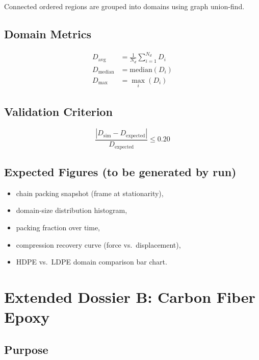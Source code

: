\documentclass[12pt]{article}
\begin{document}
Connected ordered regions are grouped into domains using graph union-find.

\subsection{Domain Metrics}

\begin{align}
	D_{\mathrm{avg}}    &= \frac{1}{N_d}\sum_{i=1}^{N_d} D_i
	\label{eq:davg} \\
	D_{\mathrm{median}} &= \mathrm{median}(D_i)
	\label{eq:dmedian} \\
	D_{\mathrm{max}}    &= \max_i(D_i)
	\label{eq:dmax}
\end{align}

\subsection{Validation Criterion}

\begin{equation}
	\frac{|D_{\mathrm{sim}} - D_{\mathrm{expected}}|}{D_{\mathrm{expected}}} \leq 0.20
\end{equation}

\subsection{Expected Figures (to be generated by run)}

\begin{itemize}[noitemsep]
	\item chain packing snapshot (frame at stationarity),
	\item domain-size distribution histogram,
	\item packing fraction over time,
	\item compression recovery curve (force vs.\ displacement),
	\item HDPE vs.\ LDPE domain comparison bar chart.
\end{itemize}

\section{Extended Dossier B: Carbon Fiber Epoxy}
\label{app:cfe}

\subsection{Purpose}
\end{document}
